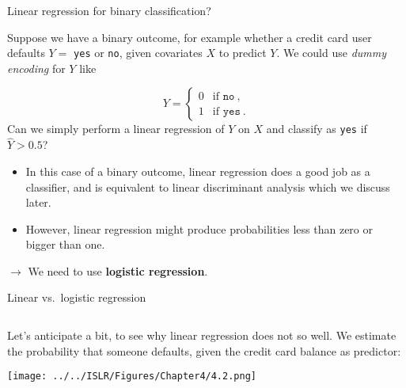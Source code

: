 \documentclass[10pt,ignorenonframetext,]{beamer}
\providecommand{\tightlist}{%
  \setlength{\itemsep}{0pt}\setlength{\parskip}{0pt}}
\begin{document}
\begin{frame}[fragile]

\begin{block}{Linear regression for binary classification?}

\vspace{1mm}

Suppose we have a binary outcome, for example whether a credit card user
defaults \(Y =\) \texttt{yes} or \texttt{no}, given covariates \(X\) to
predict \(Y\). We could use \emph{dummy encoding} for \(Y\) like

\[Y = \left\{ \begin{array}{ll}
0 & \text{if } \texttt{no} \ , \\
1 & \text{if } \texttt{yes} \ .
\end{array} \right.\] Can we simply perform a linear regression of \(Y\)
on \(X\) and classify as \texttt{yes} if \(\hat{Y}> 0.5\)?

\vspace{2mm}

\begin{itemize}
\tightlist
\item
  In this case of a binary outcome, linear regression does a good job as
  a classifier, and is equivalent to linear discriminant analysis which
  we discuss later.
\end{itemize}

\vspace{2mm}

\begin{itemize}
\tightlist
\item
  However, linear regression might produce probabilities less than zero
  or bigger than one.
\end{itemize}

\vspace{2mm}

\(\rightarrow\) We need to use \textbf{logistic regression}.

\end{block}

\end{frame}

\begin{frame}

\begin{block}{Linear vs.~logistic regression}

\(~\)

Let's anticipate a bit, to see why linear regression does not so well.
We estimate the probability that someone defaults, given the credit card
balance as predictor: \vspace{2mm}

\texttt{[image: ../../ISLR/Figures/Chapter4/4.2.png]}

\end{block}

\end{frame}
\end{document}
